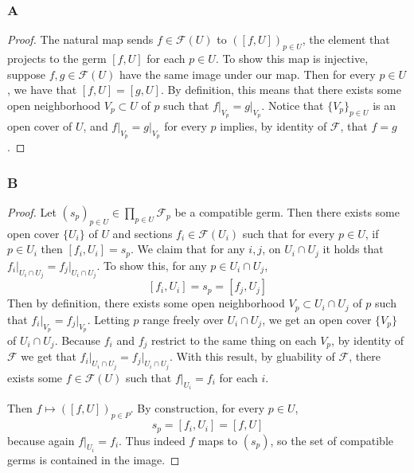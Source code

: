 \documentclass{article}
\newcommand{\fF}{\mathscr{F}}
\begin{document}
\subsubsection{A}\label{2.4.A}
\begin{proof}
    The natural map sends $f\in \fF(U)$ to $([f,U])_{p\in U}$, the element that projects to the germ $[f,U]$ for each $p\in U$. To show this map is injective, suppose $f,g\in \fF(U)$ have the same image under our map. Then for every $p\in U$, we have that $[f,U]=[g,U]$. By definition, this means that there exists some open neighborhood $V_p\subset U$ of $p$ such that $f\vert_{V_p}=g\vert_{V_p}$. Notice that $\{V_p\}_{p\in U}$ is an open cover of $U$, and $f\vert_{V_p}=g\vert_{V_p}$ for every $p$ implies, by identity of $\fF$, that $f=g$.
\end{proof}
\subsubsection{B}\label{2.4.B}
\begin{proof}
    Let $(s_p)_{p\in U}\in \prod_{p\in U} \fF_p$ be a compatible germ. Then there exists some open cover $\{U_i\}$ of $U$ and sections $f_i\in \fF(U_i)$ such that for every $p\in U$, if $p\in U_i$ then $[f_i,U_i]=s_p$. We claim that for any $i,j$, on $U_i\cap U_j$ it holds that $f_i\vert_{U_i\cap U_j}=f_j\vert_{U_i \cap U_j}$. To show this, for any $p\in U_i\cap U_j$, 
    \[
    [f_i,U_i]=s_p=[f_j,U_j]
    \]
    Then by definition, there exists some open neighborhood $V_p\subset U_i\cap U_j$ of $p$ such that $f_i\vert_{V_p}=f_j\vert_{V_p}$. Letting $p$ range freely over $U_i\cap U_j$, we get an open cover $\{V_p\}$ of $U_i\cap U_j$. Because $f_i$ and $f_j$ restrict to the same thing on each $V_p$, by identity of $\fF$ we get that $f_i\vert_{U_i\cap U_j}=f_j\vert_{U_i\cap U_j}$. With this result, by gluability of $\fF$, there exists some $f\in \fF(U)$ such that $f\vert_{U_i}=f_i$ for each $i$.

    Then $f\mapsto ([f,U])_{p\in P}$. By construction, for every $p\in U$,
    \[
    s_p=[f_i,U_i]=[f,U]
    \]
    because again $f\vert_{U_i}=f_i$. Thus indeed $f$ maps to $(s_p)$, so the set of compatible germs is contained in the image.
\end{proof}
\end{document}
